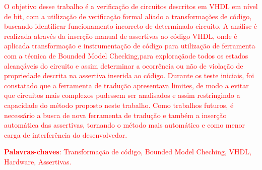\textcolor{red}{O objetivo desse trabalho é a verificação de circuitos descritos em VHDL em nível de bit, com a utilização de verificação formal aliado a transformações de código, buscando identificar funcionamento incorreto de determinado circuito. A análise é realizada através da inserção manual de assertivas ao código VHDL, onde é aplicada transformação e instrumentação de código para utilização de ferramenta com a técnica de Bounded Model Checking,para exploraçãode todos os estados alcançáveis do circuito e assim determinar a ocorrência ou não de violação de propriedade descrita na assertiva inserida ao código. Durante os teste iniciais, foi constatado que a ferramenta de tradução apresentava limites, de modo a evitar que circuitos mais complexos pudessem ser analisados e assim restringindo a capacidade do método proposto neste trabalho. Como trabalhos futuros, é necessário a busca de nova ferramenta de tradução e também a inserção automática das assertivas, tornando o método mais automático e como menor carga de interferência do desenvolvedor.}
\vspace{\onelineskip}
\noindent
\par
\textcolor{red}{\textbf{Palavras-chaves}: Transformação de código, Bounded Model Cheching, VHDL, Hardware, Assertivas.}